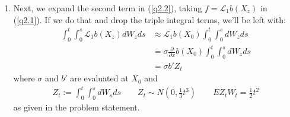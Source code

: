 \documentclass[12pt]{article}
\theoremstyle{plain}
\theoremstyle{definition}
\theoremstyle{remark}
\begin{document}
\begin{enumerate}
\begin{enumerate}
      \item Next, we expand the second term in (\ref{q2.2}), taking
        $f=\mathscr{L}_1b(X_z)$ in (\ref{q2.1}). If we do that and drop
        the triple integral terms, we'll be left with:
        \begin{align*}
          \int^t_0 \int^s_0 \mathscr{L}_1 b(X_z) dW_z ds
          &\approx
          \mathscr{L}_1 b(X_0)
          \int^t_0 \int^s_0 dW_z ds\\
          &=
          \sigma \frac{\partial}{\partial x}
          b(X_0)
          \int^t_0 \int^s_0 dW_z ds\\
          &=
          \sigma b' Z_t
        \end{align*}
        where $\sigma$ and $b'$ are evaluated at $X_0$ and
        \begin{align*}
          Z_t:=\int^t_0\int^s_0 dW_s ds
          \qquad
          Z_t \sim N(0,\frac{1}{3}t^3)
          \qquad EZ_t W_t = \frac{1}{2}t^2
        \end{align*}
        as given in the problem statement.


\end{enumerate}
\end{enumerate}
\end{document}
